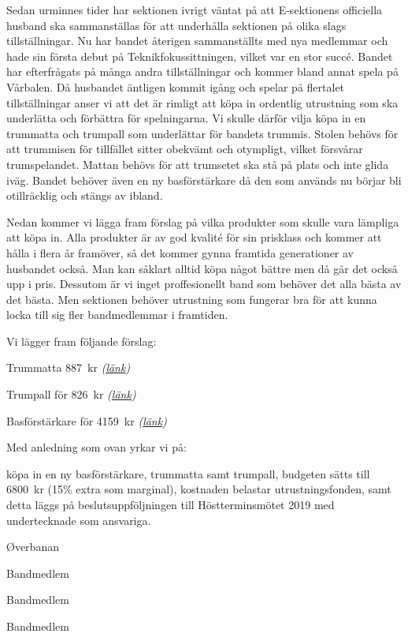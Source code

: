 \documentclass[../_main/handlingar.tex]{subfiles}
\begin{document}

Sedan urminnes tider har sektionen ivrigt väntat på att E-sektionens officiella husband ska sammanställas för att underhålla sektionen på olika slags tillställningar. Nu har bandet återigen sammanställts med nya medlemmar och hade sin första debut på Teknikfokussittningen, vilket var en stor succé. Bandet har efterfrågats på många andra tillställningar och kommer bland annat spela på Vårbalen. 
Då husbandet äntligen kommit igång och spelar på flertalet tillställningar anser vi att det är rimligt att köpa in ordentlig utrustning som ska underlätta och förbättra för spelningarna.  Vi skulle därför vilja köpa in en trummatta och trumpall som underlättar för bandets trummis. Stolen behövs för att trummisen för tillfället sitter obekvämt och otympligt, vilket försvårar trumspelandet. Mattan behövs för att trumsetet ska stå på plats och inte glida iväg. Bandet behöver även en ny basförstärkare då den som används nu börjar bli otillräcklig och stängs av ibland.\newline

Nedan kommer vi lägga fram förslag på vilka produkter som skulle vara lämpliga att köpa in. Alla produkter är av god kvalité för sin prisklass och kommer att hålla i flera år framöver, så det kommer gynna framtida generationer av husbandet också. Man kan såklart alltid köpa något bättre men då går det också upp i pris. Dessutom är vi inget proffesionellt band som behöver det alla bästa av det bästa. Men sektionen behöver utrustning som fungerar bra för att kunna locka till sig fler bandmedlemmar i framtiden.\newline

Vi lägger fram följande förslag:
\begin{dashlist}
    \item Trummatta \SI{887}{kr} \textit{(\href{https://www.thomann.de/se/meinl_mdr_or_oriental_drum_rug.htm?glp=1&gclid=CjwKCAjwm-fkBRBBEiwA966fZL-UsFSeI5L6Yf88U_LjaWEssJDMeWpkyfgSy1Q2b6NpAoJXO0JvPxoCjS4QAvD_BwE}{länk})}
    \item Trumpall för \SI{826}{kr} \textit{(\href{https://www.thomann.de/se/km_14010_drum_throne_piccolino.htm}{länk})}
    \item Basförstärkare för \SI{4159}{kr} \textit{(\href{https://www.thomann.de/se/ampeg_ba_115_v2.htm}{länk})}
\end{dashlist}

Med anledning som ovan yrkar vi på:
\begin{attsatser}
    \att köpa in en ny basförstärkare, trummatta samt trumpall,
    \att budgeten sätts till \SI{6800}{kr} (15\% extra som marginal),
	\att kostnaden belastar utrustningsfonden, samt
	\att detta läggs på beslutsuppföljningen till Höstterminsmötet 2019 med undertecknade som ansvariga.
\end{attsatser}

\begin{signatures}{4}
	\mvh
	\signature{William Sjödin}{Øverbanan}
	\signature{Daniel Bakic}{Bandmedlem}
    \signature{Oskar Magnusson}{Bandmedlem}
    \signature{Valter Möller}{Bandmedlem}
\end{signatures}
\end{document}

